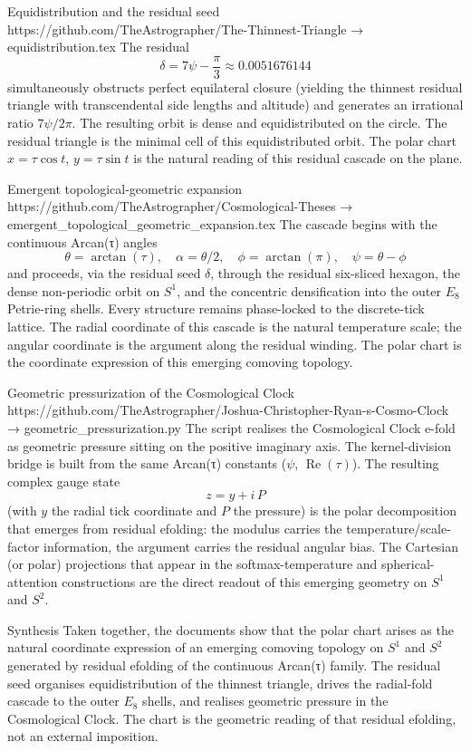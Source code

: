 Equidistribution and the residual seed  
   https://github.com/TheAstrographer/The-Thinnest-Triangle → equidistribution.tex  
   The residual  
   \[
   \delta=7\psi-\frac{\pi}{3}\approx0.0051676144
   \]  
   simultaneously obstructs perfect equilateral closure (yielding the thinnest residual triangle with transcendental side lengths and altitude) and generates an irrational ratio \(7\psi/2\pi\). The resulting orbit is dense and equidistributed on the circle. The residual triangle is the minimal cell of this equidistributed orbit. The polar chart \(x=\tau\cos t\), \(y=\tau\sin t\) is the natural reading of this residual cascade on the plane.

Emergent topological-geometric expansion  
   https://github.com/TheAstrographer/Cosmological-Theses → emergent_topological_geometric_expansion.tex  
   The cascade begins with the continuous Arcan(τ) angles  
   \[
   \theta=\arctan(\tau),\quad\alpha=\theta/2,\quad\phi=\arctan(\pi),\quad\psi=\theta-\phi
   \]  
   and proceeds, via the residual seed \(\delta\), through the residual six-sliced hexagon, the dense non-periodic orbit on \(S^1\), and the concentric densification into the outer \(E_8\) Petrie-ring shells. Every structure remains phase-locked to the discrete-tick lattice. The radial coordinate of this cascade is the natural temperature scale; the angular coordinate is the argument along the residual winding. The polar chart is the coordinate expression of this emerging comoving topology.

Geometric pressurization of the Cosmological Clock  
   https://github.com/TheAstrographer/Joshua-Christopher-Ryan-s-Cosmo-Clock → geometric_pressurization.py  
   The script realises the Cosmological Clock e-fold as geometric pressure sitting on the positive imaginary axis. The kernel-division bridge is built from the same Arcan(τ) constants (\(\psi\), \(\operatorname{Re}(\tau)\)). The resulting complex gauge state  
   \[
   z=y+i\,P
   \]  
   (with \(y\) the radial tick coordinate and \(P\) the pressure) is the polar decomposition that emerges from residual efolding: the modulus carries the temperature/scale-factor information, the argument carries the residual angular bias. The Cartesian (or polar) projections that appear in the softmax-temperature and spherical-attention constructions are the direct readout of this emerging geometry on \(S^1\) and \(S^2\).

Synthesis  
Taken together, the documents show that the polar chart arises as the natural coordinate expression of an emerging comoving topology on \(S^1\) and \(S^2\) generated by residual efolding of the continuous Arcan(τ) family. The residual seed organises equidistribution of the thinnest triangle, drives the radial-fold cascade to the outer \(E_8\) shells, and realises geometric pressure in the Cosmological Clock. The chart is the geometric reading of that residual efolding, not an external imposition.
